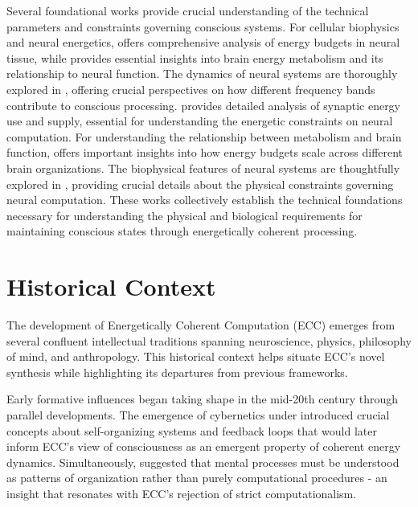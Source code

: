 \begin{refsection}
Several foundational works provide crucial understanding of the technical parameters and constraints governing conscious systems. For cellular biophysics and neural energetics, \cite{attwell2001energy} offers comprehensive analysis of energy budgets in neural tissue, while \cite{magistretti2015cellular} provides essential insights into brain energy metabolism and its relationship to neural function. The dynamics of neural systems are thoroughly explored in \cite{buzsaki2006rhythms}, offering crucial perspectives on how different frequency bands contribute to conscious processing. \cite{harris2012synaptic} provides detailed analysis of synaptic energy use and supply, essential for understanding the energetic constraints on neural computation. For understanding the relationship between metabolism and brain function, \cite{herculano2011scaling} offers important insights into how energy budgets scale across different brain organizations. The biophysical features of neural systems are thoughtfully explored in \cite{georgiou2012biophysical}, providing crucial details about the physical constraints governing neural computation. These works collectively establish the technical foundations necessary for understanding the physical and biological requirements for maintaining conscious states through energetically coherent processing.

\newpage

\section{Historical Context}

The development of Energetically Coherent Computation (ECC) emerges from several confluent intellectual traditions spanning neuroscience, physics, philosophy of mind, and anthropology. This historical context helps situate ECC's novel synthesis while highlighting its departures from previous frameworks.

Early formative influences began taking shape in the mid-20th century through parallel developments. The emergence of cybernetics under \cite{wiener1948cybernetics} introduced crucial concepts about self-organizing systems and feedback loops that would later inform ECC's view of consciousness as an emergent property of coherent energy dynamics. Simultaneously, \cite{bateson1972steps} suggested that mental processes must be understood as patterns of organization rather than purely computational procedures - an insight that resonates with ECC's rejection of strict computationalism.


\end{refsection}
